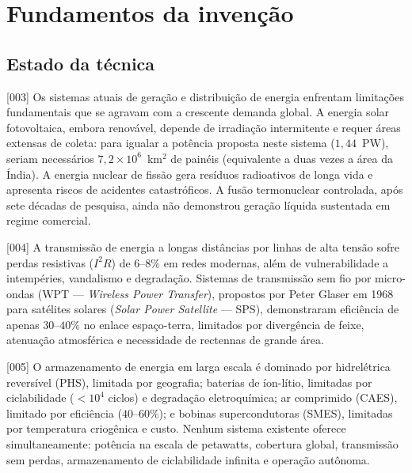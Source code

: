 \documentclass[12pt,a4paper]{article}
\begin{document}
\section{Fundamentos da invenção}

\subsection{Estado da técnica}

{[003]} Os sistemas atuais de geração e distribuição de energia enfrentam limitações fundamentais que se agravam com a crescente demanda global. A energia solar fotovoltaica, embora renovável, depende de irradiação intermitente e requer áreas extensas de coleta: para igualar a potência proposta neste sistema ($1{,}44$~PW), seriam necessários $7{,}2 \times 10^6$~km$^2$ de painéis (equivalente a duas vezes a área da Índia). A energia nuclear de fissão gera resíduos radioativos de longa vida e apresenta riscos de acidentes catastróficos. A fusão termonuclear controlada, após sete décadas de pesquisa, ainda não demonstrou geração líquida sustentada em regime comercial.

{[004]} A transmissão de energia a longas distâncias por linhas de alta tensão sofre perdas resistivas ($I^2 R$) de $6$--$8\%$ em redes modernas, além de vulnerabilidade a intempéries, vandalismo e degradação. Sistemas de transmissão sem fio por micro-ondas (WPT --- \textit{Wireless Power Transfer}), propostos por Peter Glaser em 1968 para satélites solares (\textit{Solar Power Satellite} --- SPS), demonstraram eficiência de apenas $30$--$40\%$ no enlace espaço-terra, limitados por divergência de feixe, atenuação atmosférica e necessidade de rectennas de grande área.

{[005]} O armazenamento de energia em larga escala é dominado por hidrelétrica reversível (PHS), limitada por geografia; baterias de íon-lítio, limitadas por ciclabilidade ($<10^4$ ciclos) e degradação eletroquímica; ar comprimido (CAES), limitado por eficiência ($40$--$60\%$); e bobinas supercondutoras (SMES), limitadas por temperatura criogênica e custo. Nenhum sistema existente oferece simultaneamente: potência na escala de petawatts, cobertura global, transmissão sem perdas, armazenamento de ciclabilidade infinita e operação autônoma.
\end{document}
